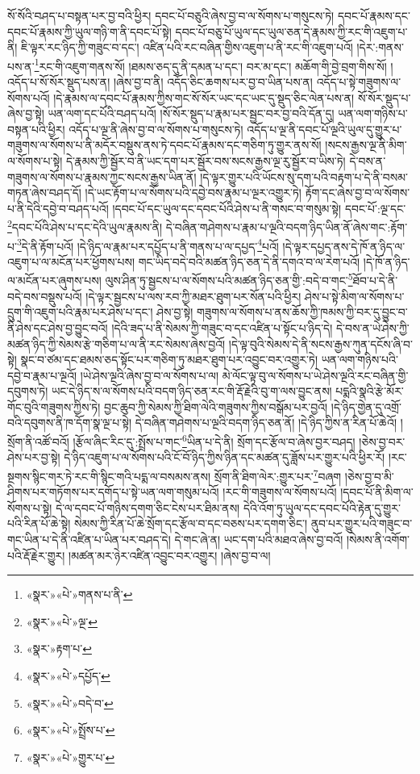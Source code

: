 སོ་སོའི་བཤད་པ་བསྟན་པར་བྱ་བའི་ཕྱིར། དབང་པོ་བཅུའི་ཞེས་བྱ་བ་ལ་སོགས་པ་གསུངས་ཏེ། དབང་པོ་རྣམས་དང་དབང་པོ་རྣམས་ཀྱི་ཡུལ་གཉི་ག་ནི་དབང་པོ་སྟེ། དབང་པོ་བཅུ་པོ་ཡུལ་དང་ཡུལ་ཅན་དེ་རྣམས་ཀྱི་རང་གི་འཇུག་པ་ནི། ཇི་ལྟར་རང་ཉིད་ཀྱི་གཟུང་བ་དང་། འཛིན་པའི་རང་བཞིན་གྱིས་འཇུག་པ་ནི་རང་གི་འཇུག་པའོ། །དེར་:གནས་པས་ན་\footnote{«སྣར་»«པེ་»གནས་པ་ནི་}རང་གི་འཇུག་གནས་སོ། །ཐམས་ཅད་དུ་ནི་དམན་པ་དང་། བར་མ་དང་། མཆོག་གི་བྱེ་བྲག་གིས་སོ། །འདོད་པ་སོ་སོར་སྡུད་པས་ན། །ཞེས་བྱ་བ་ནི། འདོད་ཅིང་ཆགས་པར་བྱ་བ་ཡིན་པས་ན། འདོད་པ་སྟེ་གཟུགས་ལ་སོགས་པའོ། །དེ་རྣམས་ལ་དབང་པོ་རྣམས་ཀྱིས་གང་སོ་སོར་ཡང་དང་ཡང་དུ་སྡུད་ཅིང་ལེན་པས་ན། སོ་སོར་སྡུད་པ་ཞེས་བྱ་སྟེ། ཡན་ལག་དང་པོའི་བཤད་པའོ། །སོ་སོར་སྡུད་པ་རྣམ་པར་སྦྱང་བར་བྱ་བའི་དོན་དུ། ཡན་ལག་གཉིས་པ་བསྟན་པའི་ཕྱིར། འདོད་པ་ལྔ་ནི་ཞེས་བྱ་བ་ལ་སོགས་པ་གསུངས་ཏེ། འདོད་པ་ལྔ་ནི་དབང་པོ་ལྔའི་ཡུལ་དུ་གྱུར་པ་གཟུགས་ལ་སོགས་པ་ནི་མདོར་བསྡུས་ནས་ཏེ་དབང་པོ་རྣམས་དང་གཅིག་ཏུ་གྱུར་ནས་སོ། །སངས་རྒྱས་ལྔ་ནི་མིག་ལ་སོགས་པ་སྟེ། དེ་རྣམས་ཀྱི་སྦྱོར་བ་ནི་ཡང་དག་པར་སྦྱོར་བས་སངས་རྒྱས་ལྔ་རུ་སྦྱོར་བ་ཡིས་ཏེ། དེ་བས་ན་གཟུགས་ལ་སོགས་པ་རྣམས་ཀྱང་སངས་རྒྱས་ཡིན་ནོ། །དེ་ལྟར་གྱུར་པའི་ཡོངས་སུ་དག་པའི་བརྟག་པ་དེ་ནི་བསམ་གཏན་ཞེས་བཤད་དོ། །དེ་ཡང་རྟོག་པ་ལ་སོགས་པའི་དབྱེ་བས་རྣམ་པ་ལྔར་འགྱུར་ཏེ། རྟོག་དང་ཞེས་བྱ་བ་ལ་སོགས་པ་ནི་དེའི་དབྱེ་བ་བཤད་པའོ། །དབང་པོ་དང་ཡུལ་དང་དབང་པོའི་ཤེས་པ་ནི་གསང་བ་གསུམ་སྟེ། དབང་པོ་:ལྔ་དང་\footnote{«སྣར་»«པེ་»ལྔ་}དབང་པོའི་ཤེས་པ་དང་དེའི་ཡུལ་རྣམས་ནི། དེ་བཞིན་གཤེགས་པ་རྣམ་པ་ལྔའི་བདག་ཉིད་ཡིན་ནོ་ཞེས་གང་:རྟོག་པ་\footnote{«སྣར་»རྟག་པ་}དེ་ནི་རྟོག་པའོ། །དེ་ཉིད་ལ་རྣམ་པར་དཔྱོད་པ་ནི་གནས་པ་ལ་དཔྱད་\footnote{«སྣར་»«པེ་»དཔྱོད་}པའོ། །དེ་ལྟར་དཔྱད་ནས་དེ་ཁོ་ན་ཉིད་ལ་འཇུག་པ་ལ་མངོན་པར་ཕྱོགས་པས། གང་ཡིད་བདེ་བའི་མཚན་ཉིད་ཅན་དེ་ནི་དགའ་བ་ལ་རེག་པའོ། །དེ་ཁོ་ན་ཉིད་ལ་མངོན་པར་ཞུགས་པས། ལུས་ཤིན་ཏུ་སྦྱངས་པ་ལ་སོགས་པའི་མཚན་ཉིད་ཅན་གྱི་:བདེ་བ་གང་\footnote{«སྣར་»«པེ་»བདེ་བ་}ཐོབ་པ་དེ་ནི་བདེ་བས་བསྡུས་པའོ། །དེ་ལྟར་སྦྱངས་པ་ལས་རབ་ཀྱི་མཐར་ཐུག་པར་སོན་པའི་ཕྱིར། ཤེས་པ་སྟེ་མིག་ལ་སོགས་པ་དྲུག་གི་འཇུག་པའི་རྣམ་པར་ཤེས་པ་དང་། ཤེས་བྱ་སྟེ། གཟུགས་ལ་སོགས་པ་ནས་ཆོས་ཀྱི་ཁམས་ཀྱི་བར་དུ་བྱུང་བ་ནི་ཤེས་དང་ཤེས་བྱ་བྱུང་བའོ། །དེའི་ཟད་པ་ནི་སེམས་ཀྱི་གཟུང་བ་དང་འཛིན་པ་སྟོང་པ་ཉིད་དེ། དེ་བས་ན་ཡེ་ཤེས་ཀྱི་མཚན་ཉིད་ཀྱི་སེམས་རྩེ་གཅིག་པ་ལ་ནི་རང་སེམས་ཞེས་བྱའོ། །དེ་ལྟ་བུའི་སེམས་དེ་ནི་སངས་རྒྱས་ཀུན་དངོས་ཞི་བ་སྟེ། སྣང་བ་ཙམ་དང་ཐམས་ཅད་སྟོང་པར་གཅིག་ཏུ་མཐར་ཐུག་པར་འབྱུང་བར་འགྱུར་ཏེ། ཡན་ལག་གཉིས་པའི་དབྱེ་བ་རྣམ་པ་ལྔའོ། །ཡེ་ཤེས་ལྔའི་ཞེས་བྱ་བ་ལ་སོགས་པ་ལ། མེ་ལོང་ལྟ་བུ་ལ་སོགས་པ་ཡེ་ཤེས་ལྔའི་རང་བཞིན་གྱི་དབུགས་ཏེ། ཡང་དེ་ཉིད་ས་ལ་སོགས་པའི་བདག་ཉིད་ཅན་རང་གི་རྡོ་རྗེའི་བུ་ག་ལས་བྱུང་ནས། པདྨའི་སྣའི་རྩེ་མོར་གོང་བུའི་གཟུགས་ཀྱིས་ཏེ། བྱང་ཆུབ་ཀྱི་སེམས་ཀྱི་ཐིག་ལེའི་གཟུགས་ཀྱིས་བསྒོམ་པར་བྱའོ། །དེ་ཉིད་གྱེན་དུ་འགྲོ་བའི་དབུགས་ནི་ཁ་དོག་སྣ་ལྔ་པ་སྟེ། དེ་བཞིན་གཤེགས་པ་ལྔའི་བདག་ཉིད་ཅན་ནོ། །དེ་ཉིད་ཀྱིས་ན་རིན་པོ་ཆེའོ། །སྲོག་ནི་འཚོ་བའོ། །རྩོལ་ཞིང་རིང་དུ་:སྤྲོས་པ་གང་\footnote{«སྣར་»«པེ་»སྤྲོས་པ་}ཡིན་པ་དེ་ནི། སྲོག་དང་རྩོལ་བ་ཞེས་བྱར་བཤད། །ཅེས་བྱ་བར་ཤེས་པར་བྱ་སྟེ། དེ་ཉིད་འཇུག་པ་ལ་སོགས་པའི་ངོ་བོ་ཉིད་ཀྱིས་ཉིན་དང་མཚན་དུ་ཟློས་པར་གྱུར་པའི་ཕྱིར་རོ། །རང་སྔགས་སྙིང་གར་ཏེ་རང་གི་སྙིང་གའི་པདྨ་ལ་བསམས་ནས། སྲོག་ནི་ཐིག་ལེར་:གྱུར་པར་\footnote{«སྣར་»«པེ་»གྱུར་པ་}བཞག །ཅེས་བྱ་བ་མི་ཤིགས་པར་གཏོགས་པར་དགོད་པ་སྟེ་ཡན་ལག་གསུམ་པའོ། །རང་གི་གཟུགས་ལ་སོགས་པའོ། །དབང་པོ་ནི་མིག་ལ་སོགས་པ་སྟེ། དེ་ལ་དབང་པོ་གཉིས་དགག་ཅིང་ངེས་པར་ཐིམ་ནས། དེའི་འོག་ཏུ་ཡུལ་དང་དབང་པོའི་རྟེན་དུ་གྱུར་པའི་རིན་པོ་ཆེ་སྟེ། སེམས་ཀྱི་རིན་པོ་ཆེ་སྲོག་དང་རྩོལ་བ་དང་བཅས་པར་དགག་ཅིང་། ནུབ་པར་གྱུར་པའི་གཟུང་བ་གང་ཡིན་པ་དེ་ནི་འཛིན་པ་ཡིན་པར་བཤད་དེ། དེ་གང་ཞེ་ན། ཡང་དག་པའི་མཐའ་ཞེས་བྱ་བའོ། །སེམས་ནི་འགོག་པའི་རྡོ་རྗེར་གྱུར། །མཚན་མར་ཉེར་འཛིན་འབྱུང་བར་འགྱུར། །ཞེས་བྱ་བ་ལ། 